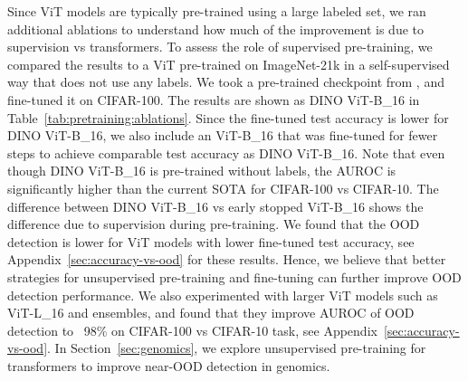 \documentclass{article}
\begin{document}
Since ViT models are typically pre-trained using a large labeled set, we ran additional ablations to understand how much of the improvement is due to supervision vs transformers.  
To assess the role of supervised pre-training, we compared the results to a ViT pre-trained on ImageNet-21k in a self-supervised way that does not use any labels. We took a pre-trained checkpoint from \citet{caron2021emerging}, and fine-tuned it on CIFAR-100. The results are shown as DINO ViT-B\_16 in  Table~\ref{tab:pretraining:ablations}. 
Since the fine-tuned test accuracy is lower for DINO ViT-B\_16, we also include an ViT-B\_16 that was fine-tuned for fewer steps to achieve comparable test accuracy as DINO ViT-B\_16.  
Note that even though DINO ViT-B\_16 is pre-trained without labels, the AUROC is significantly higher than the current SOTA for CIFAR-100 vs CIFAR-10. 
The difference between DINO ViT-B\_16 vs early stopped ViT-B\_16 shows the difference due to supervision during pre-training. 
We found that the OOD detection is lower for ViT models with lower fine-tuned test accuracy, see Appendix~\ref{sec:accuracy-vs-ood} for these results. Hence, we believe that better strategies for unsupervised pre-training and fine-tuning can further improve OOD detection performance. We also experimented with larger ViT models such as ViT-L\_16 and ensembles, and found that they improve AUROC of OOD detection to ~98\% on CIFAR-100 vs CIFAR-10 task, see Appendix~\ref{sec:accuracy-vs-ood}.  
In Section~\ref{sec:genomics}, we explore unsupervised pre-training for transformers to improve near-OOD detection in genomics. 
\end{document}

